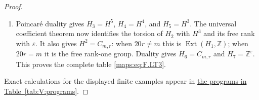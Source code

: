 \documentclass[11pt,a4paper]{article}
\numberwithin{equation}{section}
\theoremstyle{definition}
\begin{document}
\begin{proof}
\begin{enumerate}[label=\arabic*.]
\item Poincar\'e duality gives
$H_3=H^5$, $H_4=H^4$, and $H_5=H^3$.
The universal coefficient theorem now identifies
the torsion of $H_2$ with $H^3$ and its free rank
with $\varepsilon$.
It also gives $H^2=C_{m,r}$: when $20r\ne m$ this
is $\operatorname{Ext}(H_1,\mathbb Z)$; when
$20r=m$ it is the free rank-one group.
Duality gives $H_6=C_{m,r}$ and
$H_7=\mathbb Z^\varepsilon$.
This proves the complete table \eqref{maps:eq:F.LT3}.



\end{enumerate}
Exact calculations for the displayed finite examples appear in \hyperlink{prog:V:three-points}{the programs in Table~\ref*{tab:V:programs}}.
\end{proof}
\end{document}
